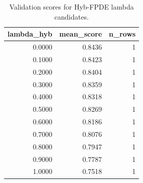 \begin{table}[t]
\caption{Validation scores for Hyb-FPDE lambda candidates.}
\label{tab:lambda_distribution_computed}
\centering
\begin{tabular}{rrr}
\toprule
lambda\_hyb & mean\_score & n\_rows \\
\midrule
0.0000 & 0.8436 & 1 \\
0.1000 & 0.8423 & 1 \\
0.2000 & 0.8404 & 1 \\
0.3000 & 0.8359 & 1 \\
0.4000 & 0.8318 & 1 \\
0.5000 & 0.8269 & 1 \\
0.6000 & 0.8186 & 1 \\
0.7000 & 0.8076 & 1 \\
0.8000 & 0.7947 & 1 \\
0.9000 & 0.7787 & 1 \\
1.0000 & 0.7518 & 1 \\
\bottomrule
\end{tabular}

\end{table}
